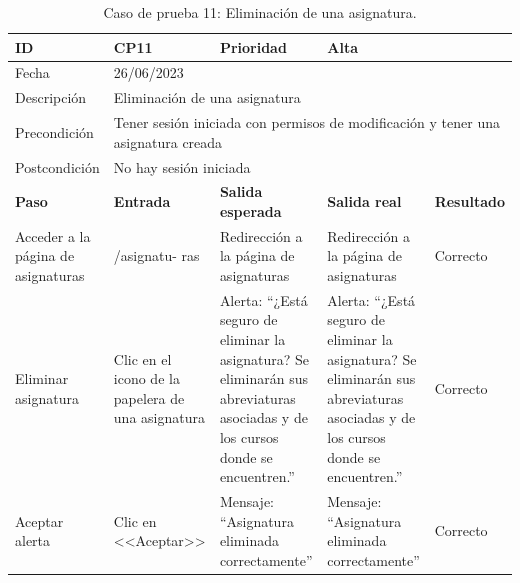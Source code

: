 \begin{table}[H]
\small
\begin{tabular}{p{} p{} p{} p{} p{}}
\cellcolor{gray!25}
ID   & CP11 & \cellcolor{gray!25} Prioridad   & Alta \\ \hline
\cellcolor{gray!25} Fecha	&	\multicolumn{4}{l}{26/06/2023} \\ \hline
\cellcolor{gray!25} Descripción		&	\multicolumn{4}{l}{Eliminación de una asignatura} \\ \hline                                            
\cellcolor{gray!25}
Precondición  & \multicolumn{4}{p{.66\textwidth}}{Tener sesión iniciada con permisos de modificación y tener una asignatura creada} \\ \hline
\cellcolor{gray!25} Postcondición & \multicolumn{4}{l}{No hay sesión iniciada}                                                    \\ \hline
\rowcolor{gray!25}
\textbf{Paso}   & \textbf{Entrada} & \textbf{Salida esperada} & \textbf{Salida real} & \textbf{Resultado} \\ \hline
Acceder a la página de asignaturas 
& /asignatu-
ras                                                                           
& Redirección a la página de asignaturas                                   
& Redirección a la página de asignaturas                                   
& Correcto                            
\\ \hline
Eliminar asignatura
& Clic en el icono de la papelera de una asignatura
& Alerta: ``¿Está seguro de eliminar la asignatura? Se eliminarán sus abreviaturas asociadas y de los cursos donde se encuentren.''
& Alerta: ``¿Está seguro de eliminar la asignatura? Se eliminarán sus abreviaturas asociadas y de los cursos donde se encuentren.''
& Correcto
\\ \hline
Aceptar alerta
& Clic en <<Aceptar>>
& Mensaje: ``Asignatura eliminada correctamente''                             
& Mensaje: ``Asignatura eliminada correctamente''  
& Correcto                            
\\ \hline              
\end{tabular}
\caption{Caso de prueba 11: Eliminación de una asignatura.}\label{table:CP11}
\end{table}

